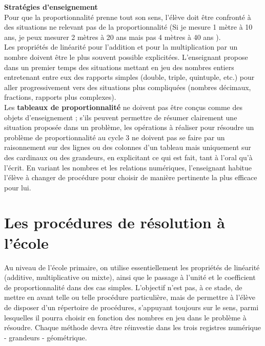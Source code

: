 {\bf\large Stratégies d'enseignement} \\ [1mm]
Pour que la proportionnalité prenne tout son sens, l’élève doit être confronté à des situations ne relevant pas de la proportionnalité (\og Si je mesure 1 mètre à 10 ans, je peux mesurer 2 mètres à 20 ans mais pas 4 mètres à 40 ans \fg). \\
Les propriétés de linéarité pour l’addition et pour la multiplication par un nombre doivent être le plus souvent possible explicitées. L’enseignant propose dans un premier temps des situations mettant en jeu des nombres entiers entretenant entre eux des rapports simples (double, triple, quintuple, etc.) pour aller progressivement vers des situations plus compliquées (nombres décimaux, fractions, rapports plus complexes). \\ [1mm]
Les {\bf tableaux de proportionnalité} ne doivent pas être conçus comme des objets d’enseignement ; s’ils peuvent permettre de résumer clairement une situation proposée dans un problème, les opérations à réaliser pour résoudre un problème de proportionnalité au cycle 3 ne doivent pas se faire par un raisonnement sur des lignes ou des colonnes d’un tableau mais uniquement sur des cardinaux ou des grandeurs, en explicitant ce qui est fait, tant à l’oral qu’à l’écrit. En variant les nombres et les relations numériques, l’enseignant habitue l’élève à changer de procédure pour choisir de manière pertinente la plus efficace pour lui.


\section{Les procédures de résolution à l'école} 
 
Au niveau de l'école primaire, on utilise essentiellement les propriétés de linéarité (additive, multiplicative ou mixte), ainsi que le passage à l'unité et le coefficient de proportionnalité dans des cas simples. L’objectif n’est pas, à ce stade, de mettre en avant telle ou telle procédure particulière, mais de permettre à l’élève de disposer d’un répertoire de procédures, s’appuyant toujours sur le sens, parmi lesquelles il pourra choisir en fonction des nombres en jeu dans le problème à résoudre. Chaque méthode devra être réinvestie dans les trois registres numérique - grandeurs - géométrique. \\

